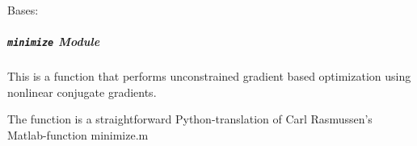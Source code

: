 \documentclass[letterpaper,10pt,english]{sphinxmanual}
\begin{document}
\begin{fulllineitems}
\label{pyGPs.Optimization:pyGPs.Optimization.conf.random_init_conf}
Bases: 

\begin{fulllineitems}
\label{pyGPs.Optimization:pyGPs.Optimization.conf.random_init_conf.covRange}
\end{fulllineitems}


\begin{fulllineitems}
\label{pyGPs.Optimization:pyGPs.Optimization.conf.random_init_conf.likRange}
\end{fulllineitems}


\begin{fulllineitems}
\label{pyGPs.Optimization:pyGPs.Optimization.conf.random_init_conf.meanRange}
\end{fulllineitems}


\end{fulllineitems}



\subparagraph{\texttt{minimize} Module}
\label{pyGPs.Optimization:module-pyGPs.Optimization.minimize}\label{pyGPs.Optimization:minimize-module}

\begin{fulllineitems}
\label{pyGPs.Optimization:pyGPs.Optimization.minimize.run}
This is a function that performs unconstrained
gradient based optimization using nonlinear conjugate gradients.

The function is a straightforward Python-translation of Carl Rasmussen's
Matlab-function minimize.m

\end{fulllineitems}
\end{document}
